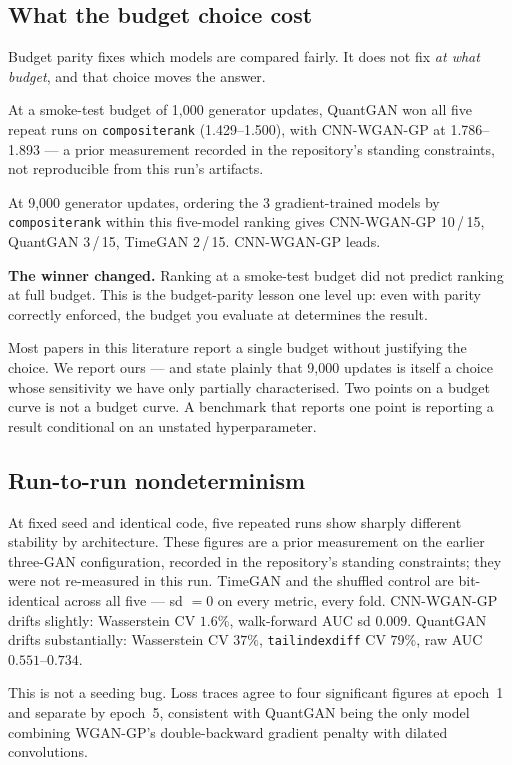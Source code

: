 \documentclass[11pt,a4paper]{article}
\makeatletter
\DeclareRobustCommand{\_}{\ifmmode\nfss@text{\textunderscore}\else\textunderscore\allowbreak\fi}
\makeatother
\begin{document}
\subsection{What the budget choice cost}
\label{sec:budget}
Budget parity fixes which models are compared fairly. It does not fix \emph{at what budget}, and that choice moves the answer.

At a smoke-test budget of 1{,}000 generator updates, QuantGAN won all five repeat runs on \texttt{composite\_rank} (1.429--1.500), with CNN-WGAN-GP at 1.786--1.893 --- a prior measurement recorded in the repository's standing constraints, not reproducible from this run's artifacts.

At 9,000 generator updates, ordering the 3 gradient-trained models by \texttt{composite\_rank} within this five-model ranking gives CNN-WGAN-GP 10\,/\,15, QuantGAN 3\,/\,15, TimeGAN 2\,/\,15. CNN-WGAN-GP leads.

\textbf{The winner changed.} Ranking at a smoke-test budget did not predict ranking at full budget. This is the budget-parity lesson one level up: even with parity correctly enforced, the budget you evaluate at determines the result.

Most papers in this literature report a single budget without justifying the choice. We report ours --- and state plainly that 9,000 updates is itself a choice whose sensitivity we have only partially characterised. Two points on a budget curve is not a budget curve. A benchmark that reports one point is reporting a result conditional on an unstated hyperparameter.

\subsection{Run-to-run nondeterminism}
\label{sec:nondeterminism}
At fixed seed and identical code, five repeated runs show sharply different stability by architecture. These figures are a prior measurement on the earlier three-GAN configuration, recorded in the repository's standing constraints; they were not re-measured in this run. TimeGAN and the shuffled control are bit-identical across all five --- sd $=0$ on every metric, every fold. CNN-WGAN-GP drifts slightly: Wasserstein CV $1.6\%$, walk-forward AUC sd $0.009$. QuantGAN drifts substantially: Wasserstein CV $37\%$, \texttt{tail\_index\_diff} CV $79\%$, raw AUC $0.551$--$0.734$.

This is not a seeding bug. Loss traces agree to four significant figures at epoch~1 and separate by epoch~5, consistent with QuantGAN being the only model combining WGAN-GP's double-backward gradient penalty with dilated convolutions.
\end{document}
